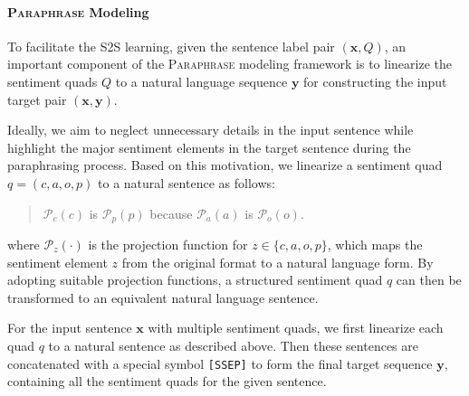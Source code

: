 \documentclass[11pt]{article}
\begin{document}
\paragraph{\textsc{Paraphrase} Modeling}
To facilitate the S2S learning, given the sentence label pair $(\boldsymbol{x}, Q)$, an important component of the \textsc{Paraphrase} modeling framework is to linearize the sentiment quads $Q$ to a natural language sequence $\boldsymbol{y}$ for constructing the input target pair $(\boldsymbol{x}, \boldsymbol{y})$.


Ideally, we aim to neglect unnecessary details in the input sentence while highlight the major sentiment elements in the target sentence during the paraphrasing process. 
Based on this motivation, we linearize a sentiment quad $q=(c, a, o, p)$ to a natural sentence as follows:
\begin{quote}
    \colorbox{mygray}{
    $\mathcal{P}_c(c)$ is $\mathcal{P}_p(p)$ because $\mathcal{P}_a(a)$ is  $\mathcal{P}_o(o)$.
    } 
\end{quote}
where $\mathcal{P}_z(\cdot)$ is the projection function for $z \in \{c, a, o, p\}$, which maps the sentiment element $z$ from the original format to a natural language form. By adopting suitable projection functions, a structured sentiment quad $q$ can then be transformed to an equivalent natural language sentence.

For the input sentence $\boldsymbol{x}$ with multiple sentiment quads, we first linearize each quad $q$ to a natural sentence as described above. Then these sentences are concatenated with a special symbol \verb|[SSEP]| to form the final target sequence $\boldsymbol{y}$, containing all the sentiment quads for the given sentence. 
\end{document}
